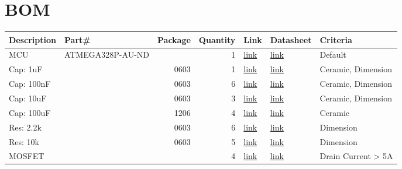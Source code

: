 \documentclass[11pt]{article}
\begin{document}
\section{BOM}
\label{sec:org53a2830}
\begin{center}
\begin{tabular}{llrrlll}
Description & Part\# & Package & Quantity & Link & Datasheet & Criteria\\
\hline
MCU & ATMEGA328P-AU-ND &  & 1 & \href{http://www.digikey.com/product-detail/en/microchip-technology/ATMEGA328P-AU/ATMEGA328P-AU-ND/1832260}{link} & \href{http://www.atmel.com/Images/Atmel-42735-8-bit-AVR-Microcontroller-ATmega328-328P\_Datasheet.pdf}{link} & Default\\
Cap: 1uF &  & 0603 & 1 & \href{https://www.digikey.com/product-detail/en/knowles-novacap/0603BB105K160YT/1763-1175-1-ND/7304294}{link} & \href{http://www.knowlescapacitors.com/getattachment/6c8d48ef-fc2b-4752-ae2c-ce6c208de0c4/High-Capacitance-Chip.aspx}{link} & Ceramic, Dimension\\
Cap: 100nF &  & 0603 & 6 & \href{https://www.mouser.com/ProductDetail/KEMET/C0603C104K5RECAUTO?qs=sGAEpiMZZMs0AnBnWHyRQKLP9quIYhdRm6YNOLxLXq7E7ljiRP9cnQ\%253d\%253d}{link} & \href{https://www.mouser.com/ds/2/212/KEM\_C1090\_X7R\_ESD-1103328.pdf}{link} & Ceramic, Dimension\\
Cap: 10uF &  & 0603 & 3 & \href{https://www.digikey.com/product-detail/en/taiyo-yuden/JMK107BJ106MA-T/587-1256-1-ND/931033}{link} & \href{https://www.yuden.co.jp/productdata/catalog/mlcc\_all\_e.pdf}{link} & Ceramic, Dimension\\
Cap: 100uF &  & 1206 & 4 & \href{https://www.digikey.com/product-detail/en/murata-electronics-north-america/GRM31CR60J107KE39L/490-13982-1-ND/6155812}{link} & \href{https://search.murata.co.jp/Ceramy/image/img/A01X/G101/ENG/GRM31CR60J107KE39-01.pdf}{link} & Ceramic\\
Res: 2.2k &  & 0603 & 6 & \href{https://www.mouser.com/ProductDetail/Vishay/CRCW02012K20JNED?qs=sGAEpiMZZMvdGkrng054tx3Kv\%25252bhbWMRFaxxOJx\%25252bImNQ\%253d}{link} & \href{https://www.mouser.com/ds/2/427/crcw0201e3-239671.pdf}{link} & Dimension\\
Res: 10k &  & 0603 & 5 & \href{https://www.mouser.com/ProductDetail/Yageo/RE0603BRE0710KL?qs=sGAEpiMZZMvdGkrng054t\%252fEV866paE0hhMI\%252fxeoFNEJCU72vYWvGgQ\%253d\%253d}{link} & \href{https://www.mouser.com/ds/2/447/PYu-RE\_105\_RoHS\_L\_6-1116121.pdf}{link} & Dimension\\
MOSFET &  &  & 4 & \href{https://www.mouser.com/productdetail/?qs=9\%25252bKlkBgLFf1HkY\%252F2U\%25252bIhLQ\%253D\%253D}{link} & \href{https://www.mouser.com/ds/2/196/irlml6244pbf-1228275.pdf}{link} & Drain Current > 5A\\

\end{tabular}
\end{center}
\end{document}
